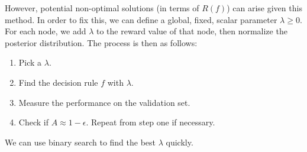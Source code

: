 \documentclass[11pt]{article}
\begin{document}
However, potential non-optimal solutions (in terms of $R(f)$) can arise given this method. In order to fix this, we can define a global, fixed, scalar parameter $\lambda \ge 0$. For each node, we add $\lambda$ to the reward value of that node, then normalize the posterior distribution. The process is then as follows:
\begin{enumerate}
\item Pick a $\lambda$.
\item Find the decision rule $f$ with $\lambda$.
\item Measure the performance on the validation set.
\item Check if $A \approx 1 - \epsilon$. Repeat from step one if necessary. 
\end{enumerate}
We can use binary search to find the best $\lambda$ quickly.\\
\end{document}
